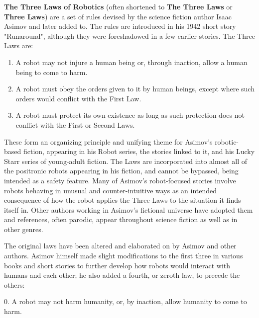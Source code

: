 


\bigskip

\bigskip

\bigskip
{}


\bigskip

\bigskip

\bigskip

\bigskip
\noindent\textbf{The Three Laws of Robotics} (often shortened to \textbf{The Three Laws} or \textbf{Three Laws}) are a set of rules devised by the science fiction author Isaac Asimov and later added to. The rules are introduced in his 1942 short story "Runaround", although they were foreshadowed in a few earlier stories. The Three Laws are:

\begin{enumerate}
\item A robot may not injure a human being or, through inaction, allow a human being to come to harm.
\item A robot must obey the orders given to it by human beings, except where such orders would conflict with the First Law.
\item A robot must protect its own existence as long as such protection does not conflict with the First or Second Laws.
\end{enumerate}

These form an organizing principle and unifying theme for Asimov's robotic-based fiction, appearing in his Robot series, the stories linked to it, and his Lucky Starr series of young-adult fiction. The Laws are incorporated into almost all of the positronic robots appearing in his fiction, and cannot be bypassed, being intended as a safety feature. Many of Asimov's robot-focused stories involve robots behaving in unusual and counter-intuitive ways as an intended consequence of how the robot applies the Three Laws to the situation it finds itself in. Other authors working in Asimov's fictional universe have adopted them and references, often parodic, appear throughout science fiction as well as in other genres.

The original laws have been altered and elaborated on by Asimov and other authors. Asimov himself made slight modifications to the first three in various books and short stories to further develop how robots would interact with humans and each other; he also added a fourth, or zeroth law, to precede the others:

    0. A robot may not harm humanity, or, by inaction, allow humanity to come to harm. 
